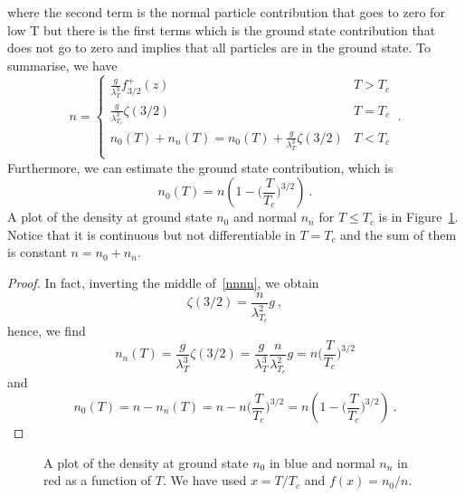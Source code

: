    where the second term is the normal particle contribution that goes to zero for low T but there is the first terms which is the ground state contribution that does not go to zero and implies that all particles are in the ground state. To summarise, we have 
    \begin{equation}\label{nnnn}
        n = \begin{cases}
            \frac{g}{\lambda_T^3} f^+_{3/2} (z) & T > T_c \\
            \frac{g}{\lambda_{T_c}^3} \zeta(3/2) & T = T_c \\
            n_0(T) + n_n(T) = n_0 (T) + \frac{g}{\lambda_{T}^3} \zeta(3/2) & T < T_c \\
        \end{cases} ~.
    \end{equation}
    Furthermore, we can estimate the ground state contribution, which is 
    \begin{equation*}
        n_0 (T) = n (1 - \Big (\frac{T}{T_c} \Big)^{3/2}) ~.
    \end{equation*} 
    A plot of the density at ground state $n_0$ and normal $n_n$ for $T \leq T_c$ is in Figure~\ref{fig:nn}. Notice that it is continuous but not differentiable in $T = T_c$ and the sum of them is constant $n = n_0 + n_n$.
    \begin{proof}
        In fact, inverting the middle of~\eqref{nnnn}, we obtain 
        \begin{equation*}
            \zeta(3/2) = \frac{n}{\lambda_{T_c}^2}{g} ~,
        \end{equation*}
        hence, we find 
        \begin{equation*}
            n_n (T) = \frac{g}{\lambda_T^3} \zeta(3/2) = \frac{g}{\lambda_T^3} \frac{n}{\lambda_{T_c}^2}{g} = n \Big (\frac{T}{T_c} \Big)^{3/2} 
        \end{equation*}
        and 
        \begin{equation*}
            n_0 (T) = n - n_n(T) = n - n \Big (\frac{T}{T_c} \Big)^{3/2} = n (1 - \Big (\frac{T}{T_c} \Big)^{3/2}) ~.
        \end{equation*}
    \end{proof}
    \begin{figure}
        \centering
        \caption{A plot of the density at ground state $n_0$ in blue and normal $n_n$ in red as a function of $T$. We have used $x = T / T_c$ and $f(x) = n_0 / n$.}
        \label{fig:nn}
    \end{figure}

